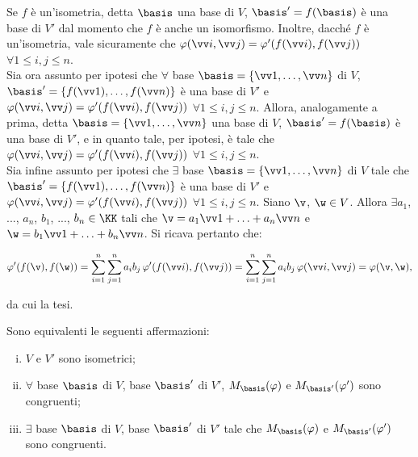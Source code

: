 \begin{solution} Se $f$ è un'isometria, detta $\basis$ una base di $V$, $\basis' = f(\basis)$ è una base di $V'$
	dal momento che $f$ è anche un isomorfismo. Inoltre, dacché $f$ è un'isometria, vale sicuramente che
	$\varphi(\vv i, \vv j) = \varphi'(f(\vv i), f(\vv j))$ $\forall 1 \leq i, j \leq n$. \\
	
	Sia ora assunto per ipotesi che $\forall$ base $\basis = \{ \vv 1, \ldots, \vv n \}$ di $V$, $\basis' = \{ f(\vv 1), \ldots, f(\vv n) \}$ è una base di $V'$ e $\varphi(\vv i, \vv j) = \varphi'(f(\vv i), f(\vv j))$ $\forall 1 \leq i, j \leq n$. Allora, analogamente a prima, detta $\basis = \{ \vv 1, \ldots, \vv n \}$ una base di $V$, $\basis' = f(\basis)$ è una base di $V'$, e in quanto tale,
	per ipotesi, è tale che $\varphi(\vv i, \vv j) = \varphi'(f(\vv i), f(\vv j))$ $\forall 1 \leq i, j \leq n$. \\
	
	Sia infine assunto per ipotesi che $\exists$ base $\basis = \{ \vv 1, \ldots, \vv n \}$ di $V$ tale che $\basis' = \{ f(\vv 1), \ldots, f(\vv n) \}$ è una base di $V'$ e $\varphi(\vv i, \vv j) = \varphi'(f(\vv i), f(\vv j))$ $\forall 1 \leq i, j \leq n$. Siano $\v$, $\w \in V$. Allora $\exists a_1$, ..., $a_n$, $b_1$, ..., $b_n \in \KK$
	tali che $\v = a_1 \vv 1 + \ldots + a_n \vv n$ e $\w = b_1 \vv 1 + \ldots + b_n \vv n$. Si ricava pertanto
	che:
	
	\[ \varphi'(f(\v), f(\w)) = \sum_{i=1}^n \sum_{j=1}^n a_i b_j \, \varphi'(f(\vv i), f(\vv j)) =
	\sum_{i=1}^n \sum_{j=1}^n a_i b_j \, \varphi(\vv i, \vv j) = \varphi(\v, \w), \]
	
	da cui la tesi.
\end{solution}

\begin{proposition} Sono equivalenti le seguenti affermazioni:
	
	\begin{enumerate}[(i)]
		\item $V$ e $V'$ sono isometrici;
		\item $\forall$ base $\basis$ di $V$, base $\basis'$ di $V'$,
		$M_\basis(\varphi)$ e $M_{\basis'}(\varphi')$ sono congruenti;
		\item $\exists$ base $\basis$ di $V$, base $\basis'$ di $V'$ tale che
		$M_\basis(\varphi)$ e $M_{\basis'}(\varphi')$ sono congruenti.
	\end{enumerate}
\end{proposition}

